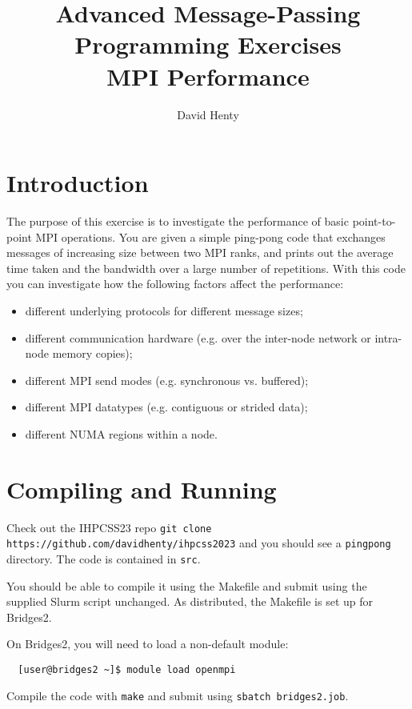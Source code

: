 \documentclass{article}
\begin{document}
\title{Advanced Message-Passing Programming Exercises \\
	MPI Performance}

\author{David Henty}
\date{}
\makeEPCCtitle

\section{Introduction}

The purpose of this exercise is to investigate the performance of
basic point-to-point MPI operations. You are given a simple ping-pong
code that exchanges messages of increasing size between two MPI ranks,
and prints out the average time taken and the bandwidth over a large
number of repetitions. With this code you can investigate how the
following factors affect the performance:

\begin{itemize}

\item different underlying protocols for different message sizes;
\item different communication hardware (e.g. over the inter-node network or
  intra-node memory copies);
\item different MPI send modes (e.g. synchronous vs. buffered);
\item different MPI datatypes (e.g. contiguous or strided data);
\item different NUMA regions within a node.

\end{itemize}

\section{Compiling and Running}

Check out the IHPCSS23 repo \texttt{git clone
  https://github.com/davidhenty/ihpcss2023} and you should see a
\texttt{pingpong} directory. The code is contained in \texttt{src}.

You should be able to compile it using the Makefile and submit using
the supplied Slurm script unchanged. As distributed, the Makefile is
set up for Bridges2.

On Bridges2, you will need to load a non-default module:
\begin{verbatim}
  [user@bridges2 ~]$ module load openmpi
\end{verbatim}

Compile the code with \texttt{make} and submit using \texttt{sbatch
  bridges2.job}.
\end{document}
